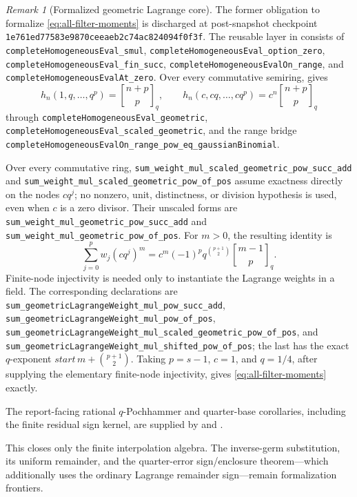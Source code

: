 \documentclass[11pt,oneside]{article}
\numberwithin{equation}{section}
\theoremstyle{definition}
\theoremstyle{remark}
\newtheorem{remark}[theorem]{Remark}
\newcommand{\qbinom}[3]{\genfrac{[}{]}{0pt}{}{#1}{#2}_{#3}}
\begin{document}
\begin{remark}[Formalized geometric Lagrange core]
The former obligation to formalize \eqref{eq:all-filter-moments} is discharged
at post-snapshot checkpoint
\nolinkurl{1e761ed77583e9870ceeaeb2c74ac824094f0f3f}.  The reusable layer in
 consists of
\nolinkurl{completeHomogeneousEval_smul},
\nolinkurl{completeHomogeneousEval_option_zero},
\nolinkurl{completeHomogeneousEval_fin_succ},
\nolinkurl{completeHomogeneousEvalOn_range}, and
\nolinkurl{completeHomogeneousEvalAt_zero}.  Over every commutative semiring,
 gives
\[
 h_n(1,q,\ldots,q^p)=\qbinom{n+p}{p}{q},
 \qquad
 h_n(c,cq,\ldots,cq^p)=c^n\qbinom{n+p}{p}{q}
\]
through \nolinkurl{completeHomogeneousEval_geometric},
\nolinkurl{completeHomogeneousEval_scaled_geometric}, and the range bridge
\nolinkurl{completeHomogeneousEvalOn_range_pow_eq_gaussianBinomial}.

Over every commutative ring,
\nolinkurl{sum_weight_mul_scaled_geometric_pow_succ_add} and
\nolinkurl{sum_weight_mul_scaled_geometric_pow_of_pos} assume exactness
directly on the nodes \(c q^j\); no nonzero, unit, distinctness, or division
hypothesis is used, even when \(c\) is a zero divisor.  Their unscaled forms
are \nolinkurl{sum_weight_mul_geometric_pow_succ_add} and
\nolinkurl{sum_weight_mul_geometric_pow_of_pos}.  For \(m>0\), the resulting
identity is
\[
 \sum_{j=0}^{p}w_j(cq^j)^m
 =c^m(-1)^p q^{\binom{p+1}{2}}\qbinom{m-1}{p}{q}.
\]
Finite-node injectivity is needed only to instantiate the Lagrange weights in
a field.  The corresponding declarations are
\nolinkurl{sum_geometricLagrangeWeight_mul_pow_succ_add},
\nolinkurl{sum_geometricLagrangeWeight_mul_pow_of_pos},
\nolinkurl{sum_geometricLagrangeWeight_mul_scaled_geometric_pow_of_pos}, and
\nolinkurl{sum_geometricLagrangeWeight_mul_shifted_pow_of_pos}; the last has
the exact \(q\)-exponent
\(start\,m+\binom{p+1}{2}\).  Taking \(p=s-1\), \(c=1\), and \(q=1/4\), after
supplying the elementary finite-node injectivity, gives
\eqref{eq:all-filter-moments} exactly.

The report-facing rational \(q\)-Pochhammer and quarter-base corollaries,
including the finite residual sign kernel, are supplied by
 and
.

This closes only the finite interpolation algebra.  The inverse-germ
substitution, its uniform remainder, and the quarter-error sign/enclosure
theorem---which additionally uses the ordinary Lagrange remainder
sign---remain formalization frontiers.
\end{remark}
\end{document}
